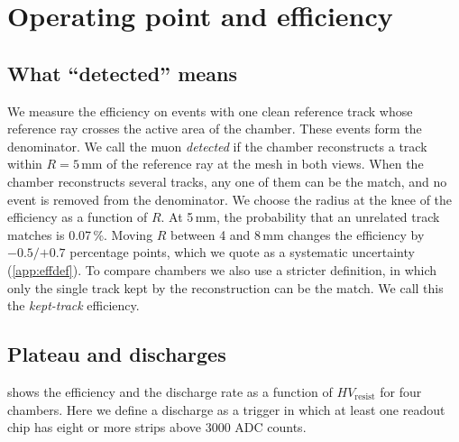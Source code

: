 \section{Operating point and efficiency}\label{sec:efficiency}

\subsection{What ``detected'' means}\label{sec:effdef}
We measure the efficiency on events with one clean reference track whose reference ray crosses the active area of
the chamber. These events form the denominator. We call the muon \emph{detected} if the chamber reconstructs a track
within $R=5$\,mm of the reference ray at the mesh in both views. When the chamber reconstructs several tracks, any one
of them can be the match, and no event is removed from the denominator. We choose the radius at the knee of the
efficiency as a function of $R$. At 5\,mm, the probability that an unrelated track matches is 0.07\,\%. Moving $R$
between 4 and 8\,mm changes the efficiency by $-0.5/{+0.7}$ percentage points, which we quote as a systematic
uncertainty (\cref{app:effdef}). To compare chambers we also use a stricter definition, in which only the single track
kept by the reconstruction can be the match. We call this the \emph{kept-track} efficiency.

\subsection{Plateau and discharges}\label{sec:hvscan}
 shows the efficiency and the discharge rate as a function of $HV_\mathrm{resist}$ for four chambers.
Here we define a discharge as a trigger in which at least one readout chip has eight or more strips above 3000 ADC
counts.

